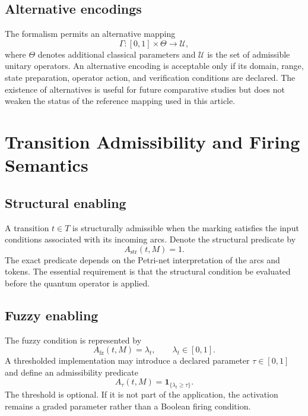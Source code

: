 \documentclass[final,3p,times]{elsarticle}
\begin{document}
\subsection{Alternative encodings}

The formalism permits an alternative mapping
\begin{equation}
    \Gamma:[0,1]\times\Theta\rightarrow\mathcal{U},
\end{equation}
where $\Theta$ denotes additional classical parameters and $\mathcal{U}$ is the set of admissible unitary operators. An alternative encoding is acceptable only if its domain, range, state preparation, operator action, and verification conditions are declared. The existence of alternatives is useful for future comparative studies but does not weaken the status of the reference mapping used in this article.

\section{Transition Admissibility and Firing Semantics}

\subsection{Structural enabling}

A transition $t\in T$ is structurally admissible when the marking satisfies the input conditions associated with its incoming arcs. Denote the structural predicate by
\begin{equation}
    A_{\mathrm{str}}(t,M)=1.
\end{equation}
The exact predicate depends on the Petri-net interpretation of the arcs and tokens. The essential requirement is that the structural condition be evaluated before the quantum operator is applied.

\subsection{Fuzzy enabling}

The fuzzy condition is represented by
\begin{equation}
    A_{\mathrm{fz}}(t,M)=\lambda_t,
    \qquad
    \lambda_t\in[0,1].
\end{equation}
A thresholded implementation may introduce a declared parameter $\tau\in[0,1]$ and define an admissibility predicate
\begin{equation}
    A_{\tau}(t,M)=\mathbf{1}_{\{\lambda_t\geq\tau\}}.
\end{equation}
The threshold is optional. If it is not part of the application, the activation remains a graded parameter rather than a Boolean firing condition.
\end{document}
